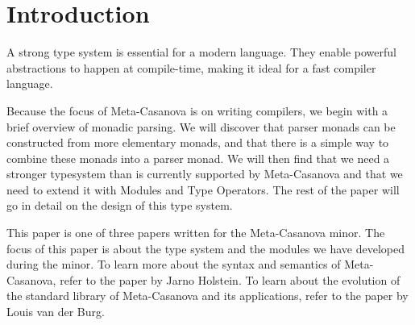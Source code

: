 \section{Introduction}
A strong type system is essential for a modern language.
They enable powerful abstractions to happen at compile-time,
making it ideal for a fast compiler language.

Because the focus of Meta-Casanova is on writing compilers,
we begin with a brief overview of monadic parsing.
We will discover that parser monads can be constructed from more elementary monads,
and that there is a simple way to combine these monads into a parser monad.
We will then find that we need a stronger typesystem than is currently supported by Meta-Casanova
and that we need to extend it with Modules and Type Operators.
The rest of the paper will go in detail on the design of this type system.

This paper is one of three papers written for the Meta-Casanova minor.
The focus of this paper is about the type system and the modules we have developed during the minor.
To learn more about the syntax and semantics of Meta-Casanova, refer to the paper by Jarno Holstein\cite{holstein16}.
To learn about the evolution of the standard library of Meta-Casanova and its applications, refer to the paper by Louis van der Burg\cite{vanderburg16}.
